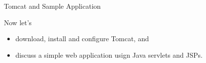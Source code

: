 \documentclass{beamer}
\begin{document}
\begin{frame}[fragile]{Tomcat and Sample Application}


Now let's 
\begin{itemize}
\item download, install and configure Tomcat, and
\item discuss a simple web application usign Java servlets and JSPs. 
\end{itemize}


\end{frame}







\end{document}

